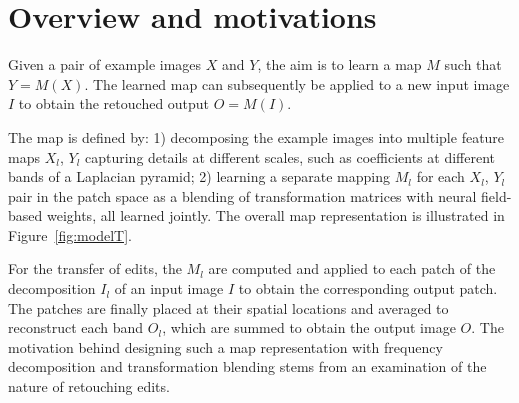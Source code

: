 \section{Overview and motivations}
\label{chap:motivations}

Given a pair of example images $X$ and $Y$, the aim is to learn a map $M$ such that $Y = M(X)$. The learned map can subsequently be applied to a new input image $I$ to obtain the retouched output $O = M(I)$.

The map is defined by: 1) decomposing the example images into multiple feature maps $X_l$, $Y_l$ capturing details at different scales, such as coefficients at different bands of a Laplacian pyramid; 2) learning a separate mapping $M_l$ for each $X_l$, $Y_l$ pair in the patch space as a blending of transformation matrices with neural field-based weights, all learned jointly. The overall map representation is illustrated in Figure~\ref{fig:modelT}.

For the transfer of edits, the $M_l$ are computed and applied to each patch of the decomposition $I_l$ of an input image $I$ to obtain the corresponding output patch. The patches are finally placed at their spatial locations and averaged to reconstruct each band $O_l$, which are summed to obtain the output image $O$. 
The motivation behind designing such a map representation with frequency decomposition and transformation blending stems from an examination of the nature of retouching edits.

